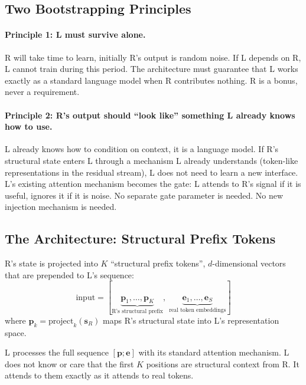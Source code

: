 \documentclass[11pt, a4paper]{article}
\theoremstyle{plain}
\theoremstyle{definition}
\theoremstyle{remark}
\begin{document}
\subsection{Two Bootstrapping Principles}

\paragraph{Principle 1: L must survive alone.}
R will take time to learn, initially R's output is random noise.
If L depends on R, L cannot train during this period.
The architecture must guarantee that L works exactly as a standard language model when R contributes nothing.
R is a bonus, never a requirement.

\paragraph{Principle 2: R's output should ``look like'' something L already knows how to use.}
L already knows how to condition on context, it is a language model.
If R's structural state enters L through a mechanism L already understands (token-like representations in the residual stream), L does not need to learn a new interface.
L's existing attention mechanism becomes the gate: L attends to R's signal if it is useful, ignores it if it is noise.
No separate gate parameter is needed.
No new injection mechanism is needed.

\subsection{The Architecture: Structural Prefix Tokens}

R's state is projected into $K$ ``structural prefix tokens'', $d$-dimensional vectors that are prepended to L's sequence:
\begin{equation}
\mathrm{input} = [\underbrace{\mathbf{p}_1, \ldots, \mathbf{p}_K}_{\text{R's structural prefix}},\; \underbrace{\mathbf{e}_1, \ldots, \mathbf{e}_S}_{\text{real token embeddings}}]
\end{equation}
where $\mathbf{p}_k = \mathrm{project}_k(\mathbf{s}_R)$ maps R's structural state into L's representation space.

L processes the full sequence $[\mathbf{p}; \mathbf{e}]$ with its standard attention mechanism.
L does not know or care that the first $K$ positions are structural context from R.
It attends to them exactly as it attends to real tokens.
\end{document}
